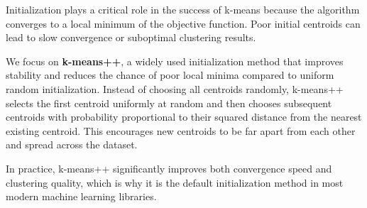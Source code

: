 \documentclass{article}
\begin{document}
Initialization plays a critical role in the success of k-means because the
algorithm converges to a local minimum of the objective function. Poor initial
centroids can lead to slow convergence or suboptimal clustering results.

We focus on \textbf{k-means++}, a widely used initialization method that improves
stability and reduces the chance of poor local minima compared to uniform random
initialization. Instead of choosing all centroids randomly, k-means++ selects the
first centroid uniformly at random and then chooses subsequent centroids with
probability proportional to their squared distance from the nearest existing
centroid. This encourages new centroids to be far apart from each other and
spread across the dataset.

In practice, k-means++ significantly improves both convergence speed and
clustering quality, which is why it is the default initialization method in most
modern machine learning libraries.



\end{document}
